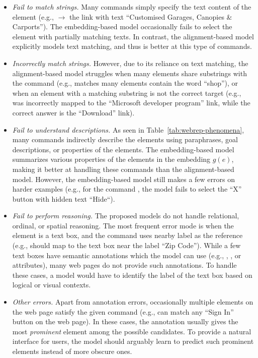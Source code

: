 \begin{itemize}
\item \emph{Fail to match strings.}
Many commands simply specify the text content of the element
(e.g., 
$\to$ the link with text
``Customised Garages, Canopies \& Carports'').
The embedding-based model
occasionally fails to select the element with partially matching texts.
In contrast, the alignment-based model
explicitly models text matching,
and thus is better at this type of commands.

\item \emph{Incorrectly match strings.}
However,
due to its reliance on text matching,
the alignment-based model struggles when many elements
share substrings with the command
(e.g.,  matches
many elements contain the word ``shop''),
or when an element with a matching substring is not the correct target
(e.g.,  was incorrectly mapped to
the ``Microsoft developer program'' link,
while the correct answer is the ``Download'' link).

\item \emph{Fail to understand descriptions.}
As seen in Table~\ref{tab:webrep-phenomena},
many commands indirectly describe the elements using paraphrases,
goal descriptions, or properties of the elements.
The embedding-based model summarizes
various properties of the elements
in the embedding $g(e)$,
making it better at handling these commands
than the alignment-based model.
However, the embedding-based model still makes
a few errors on harder examples
(e.g., for the command
,
the model fails to select the ``X'' button
with hidden text ``Hide``).

\item \emph{Fail to perform reasoning.}
The proposed models do not handle
relational, ordinal, or spatial reasoning.
The most frequent error mode is when the element is a text box,
and the command uses nearby label as the reference
(e.g., 
should map to the text box near the label ``Zip Code'').
While a few text boxes have semantic annotations
which the model can use
(e.g., , ,
or  attributes),
many web pages do not provide such annotations.
To handle these cases, a model would have to identify the label
of the text box based on logical or visual contexts.

\item \emph{Other errors.}
Apart from annotation errors,
occasionally multiple elements on the web page
satisfy the given command
(e.g., 
can match any ``Sign In'' button on the web page).
In these cases, the annotation usually gives the most \emph{prominent} element
among the possible candidates.
To provide a natural interface for users,
the model should arguably learn to predict such prominent elements
instead of more obscure ones.
\end{itemize}